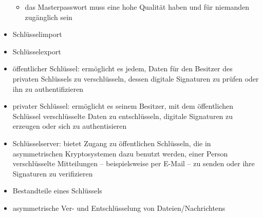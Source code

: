 \documentclass[12pt,a4paper]{article}
\begin{document}
\begin{itemize}
\begin{itemize}
        \item das Masterpasswort muss eine hohe Qualität haben und für niemanden zugänglich sein
    \end{itemize}
    \item Schlüsselimport
    \item Schlüsselexport
    \item öffentlicher Schlüssel: ermöglicht es jedem, Daten für den Besitzer des privaten Schlüssels zu verschlüsseln, dessen digitale Signaturen zu prüfen oder ihn zu authentifizieren
    \item privater Schlüssel: ermöglicht es seinem Besitzer, mit dem öffentlichen Schlüssel verschlüsselte Daten zu entschlüsseln, digitale Signaturen zu erzeugen oder sich zu authentisieren
    \item Schlüsselserver: bietet Zugang zu öffentlichen Schlüsseln, die in asymmetrischen Kryptosystemen dazu benutzt werden, einer Person verschlüsselte Mitteilungen – beispielsweise per E-Mail – zu senden oder ihre Signaturen zu verifizieren
    \item Bestandteile eines Schlüssels
    \item asymmetrische Ver- und Entschlüsselung von Dateien/Nachrichtens
\end{itemize}
\end{document}

